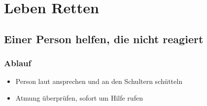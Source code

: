 \part{Leben Retten}
\chapter{Einer Person helfen, die nicht reagiert}
\section*{Ablauf}
\begin{itemize}
    \item Person laut ansprechen und an den Schultern schütteln
    \item Atmung überprüfen, sofort um Hilfe rufen
\end{itemize}